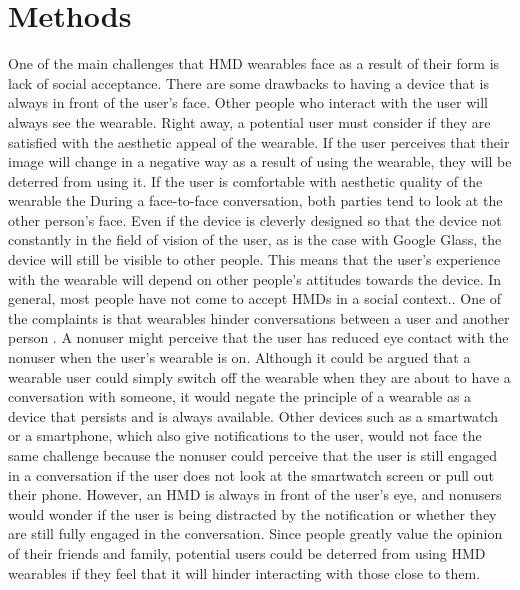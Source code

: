 \documentclass[11pt]{article}
\begin{document}
\section{Methods}

One of the main challenges that HMD wearables face as a result of their form is lack of social acceptance. There are some drawbacks to having a device that is always in front of the user's face. Other people who interact with the user will always see the wearable. Right away, a potential user must consider if they are satisfied with the aesthetic appeal of the wearable. If the user perceives that their image will change in a negative way as a result of using the wearable, they will be deterred from using it\cite{WearableHumanView}. If the user is comfortable with aesthetic quality of the wearable the  During a face-to-face conversation, both parties tend to look at the other person's face. Even if the device is cleverly designed so that the device not constantly in the field of vision of the user, as is the case with Google Glass, the device will still be visible to other people. This means that the user's experience with the wearable will depend on other people's attitudes towards the device. In general, most people have not come to accept HMDs in a social context.\cite{negativeGlassReactions}. One of the complaints is that wearables hinder conversations between a user and another person \cite{wearableFaceToFace}. A nonuser might perceive that the user has reduced eye contact with the nonuser when the user's wearable is on. Although it could be argued that a wearable user could simply switch off the wearable when they are about to have a conversation with someone, it would negate the principle of a wearable as a device that persists and is always available. Other devices such as a smartwatch or a smartphone, which also give notifications to the user, would not face the same challenge because the nonuser could perceive that the user is still engaged in a conversation if the user does not look at the smartwatch screen or pull out their phone. However, an HMD is always in front of the user's eye, and nonusers would wonder if the user is being distracted by the notification or whether they are still fully engaged in the conversation. Since people greatly value the opinion of their friends and family, potential users could be deterred from using HMD wearables if they feel that it will hinder interacting with those close to them\cite{WearableHumanView}. 
\end{document}
